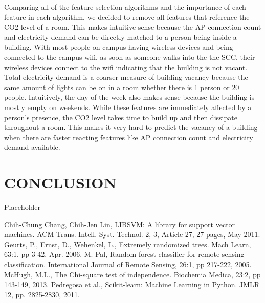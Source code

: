 \documentclass[letterpaper, 12 pt, conference]{ieeeconf}  %
\begin{document}
Comparing all of the feature selection algorithms and the importance of each feature in each algorithm, we decided to remove all features that reference the CO2 level of a room. This makes intuitive sense because the AP connection count and electricity demand can be directly matched to a person being inside a building. With most people on campus having wireless devices and being connected to the campus wifi, as soon as someone walks into the the SCC, their wireless devices connect to the wifi indicating that the building is not vacant. Total electricity demand is a coarser measure of building vacancy because the same amount of lights can be on in a room whether there is 1 person or 20 people. Intuitively, the day of the week also makes sense because the building is mostly empty on weekends. While these features are immediately affected by a person’s presence, the CO2 level takes time to build up and then dissipate throughout a room. This makes it very hard to predict the vacancy of a building when there are faster reacting features like AP connection count and electricity demand available. 

\section{CONCLUSION}

Placeholder

\addtolength{\textheight}{-12cm}   %








\begin{thebibliography}{99}

 Chih-Chung Chang, Chih-Jen Lin, LIBSVM: A library for support vector machines. ACM Trans. Intell. Syst. Technol. 2, 3, Article 27, 27 pages, May 2011.
 Geurts, P., Ernst, D., Wehenkel, L., Extremely randomized trees. Mach Learn, 63:1, pp 3-42, Apr. 2006.
 M. Pal, Random forest classifier for remote sensing classification. International Journal of Remote Sensing, 26:1, pp 217-222, 2005.
 McHugh, M.L., The Chi-square test of independence. Biochemia Medica, 23:2, pp 143-149, 2013.
 Pedregosa et al., Scikit-learn: Machine Learning in Python. JMLR 12, pp. 2825-2830, 2011.




\end{thebibliography}
\end{document}
